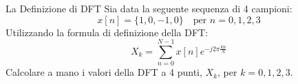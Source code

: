 
\begin{esercizio}{La Definizione di DFT}
    Sia data la seguente sequenza di 4 campioni:
    \[
        x[n] = \{1, 0, -1, 0\} \quad \text{per } n=0, 1, 2, 3
    \]
    Utilizzando la formula di definizione della DFT:
    \[
        X_k = \sum_{n=0}^{N-1} x[n] e^{-j2\pi\frac{kn}{N}}
    \]
    Calcolare a mano i valori della DFT a 4 punti, $X_k$, per $k=0, 1, 2, 3$.
\end{esercizio}